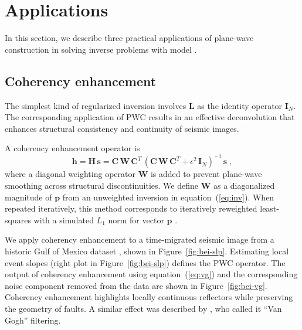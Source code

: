 \section{Applications}


In this section, we describe three practical applications of
plane-wave construction in solving inverse problems with
  model  .


\subsection{Coherency enhancement}

The simplest kind of regularized inversion involves $\mathbf{L}$ as
the identity operator $\mathbf{I}_N$. The corresponding application of
PWC   results in an
effective deconvolution that enhances structural consistency and
continuity of seismic images.

A coherency enhancement operator is
\begin{equation}
  \label{eq:vg}
  \mathbf{h = H\,s} = \mathbf{C\,W\,C}^T\,\left(\mathbf{C\,W\,C}^T + \epsilon^2\,\mathbf{I}_N\right)^{-1}\,\mathbf{s}\;,
\end{equation}
where a diagonal weighting operator $\mathbf{W}$ is added to prevent
plane-wave smoothing across structural discontinuities. We define
$\mathbf{W}$ as a diagonalized magnitude of $\mathbf{p}$ from an
unweighted inversion in equation~(\ref{eq:inv}). When repeated
iteratively, this method corresponds to iteratively reweighted
least-squares with a simulated $L_1$ norm for vector $\mathbf{p}$
\cite[]{GEO68-01-03860399}.

We apply coherency enhancement to a time-migrated seismic image from a
historic Gulf of Mexico dataset \cite[]{bei}, shown in
Figure~\ref{fig:bei-slp}.  Estimating local event slopes (right plot
in Figure~\ref{fig:bei-slp}) defines the PWC operator. The output of
coherency enhancement using equation~(\ref{eq:vg}) and the
corresponding noise component removed from the data are shown in
Figure~\ref{fig:bei-vg}. Coherency enhancement highlights locally
continuous reflectors while preserving the geometry of faults. A
similar effect was described by \cite{TLE21-03-02380243}, who called
it ``Van Gogh'' filtering.

